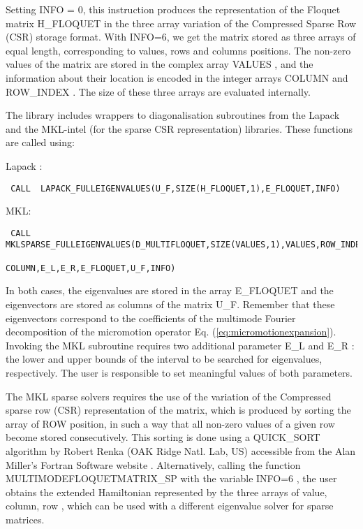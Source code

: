 \documentclass[10pt,a4paper]{article}
\begin{document}
Setting INFO = 0, this instruction produces the representation of the Floquet matrix   H\_FLOQUET   in the three array variation of the Compressed Sparse Row (CSR) storage format. With INFO=6, we get the matrix stored as three arrays of equal length, corresponding to values, rows and columns positions. The non-zero values of the matrix are stored in the complex array   VALUES ,  and the information about their location is encoded in the integer arrays   COLUMN   and   ROW\_INDEX . The size of these three arrays are evaluated internally.

The library includes wrappers to diagonalisation subroutines from the Lapack and the MKL-intel (for the sparse CSR representation) libraries. These functions are called using:

\bigskip
\noindent
Lapack :  
\begin{verbatim}
 CALL  LAPACK_FULLEIGENVALUES(U_F,SIZE(H_FLOQUET,1),E_FLOQUET,INFO)
\end{verbatim}

\noindent
MKL:
\begin{verbatim}
 CALL MKLSPARSE_FULLEIGENVALUES(D_MULTIFLOQUET,SIZE(VALUES,1),VALUES,ROW_INDEX,
                                                     COLUMN,E_L,E_R,E_FLOQUET,U_F,INFO)
\end{verbatim}

In both cases, the eigenvalues are stored in the array   E\_FLOQUET   and the eigenvectors are stored as columns of the matrix   U\_F. Remember that these eigenvectors correspond to the coefficients of the multimode Fourier decomposition of the micromotion operator Eq. (\ref{eq:micromotionexpansion}). Invoking the MKL subroutine requires two additional parameter   E\_L  and   E\_R  : the lower and upper bounds of the interval to be searched for eigenvalues, respectively. The user is responsible to set meaningful values of both parameters. 


The MKL sparse solvers requires the use of the variation of the Compressed sparse row (CSR) representation of the matrix, which is produced by sorting the array of ROW position, in such a way that all non-zero values of a given row become stored consecutively. This sorting is done using a   QUICK\_SORT  algorithm by Robert Renka (OAK Ridge Natl. Lab, US) accessible from the  Alan Miller's Fortran Software website \cite{MillerSoftware}.  Alternatively, calling the function   MULTIMODEFLOQUETMATRIX\_SP  with the variable   INFO=6  , the user obtains the extended Hamiltonian represented by the three arrays of    value,   column,   row ,  which can be used with a different eigenvalue solver for sparse matrices.
\end{document}
